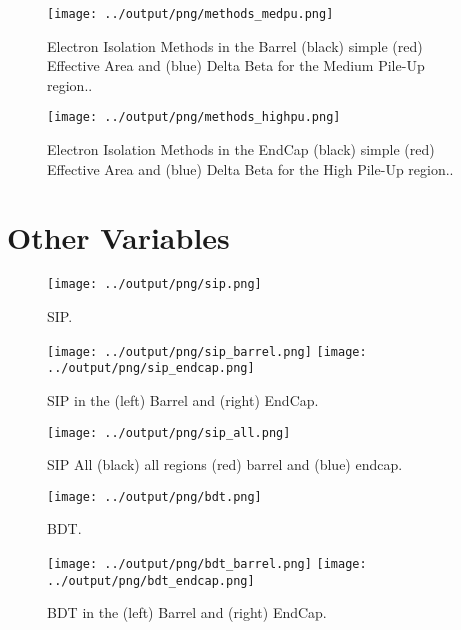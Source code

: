 \documentclass[11pt]{book}
\begin{document}
\begin{figure}[ht]
\centering
\texttt{[image: ../output/png/methods\_medpu.png]}
\caption{Electron Isolation Methods in the Barrel (black) simple (red) Effective Area and (blue) Delta Beta for the Medium Pile-Up region..}
\label{fig:methods_medpu}
\end{figure}

\begin{figure}[ht]
\centering
\texttt{[image: ../output/png/methods\_highpu.png]}
\caption{Electron Isolation Methods in the EndCap (black) simple (red) Effective Area and (blue) Delta Beta for the High Pile-Up region..}
\label{fig:methods_highpu}
\end{figure}
\clearpage


\section{Other Variables}

\begin{figure}[ht]
\centering
\texttt{[image: ../output/png/sip.png]}
\caption{SIP.}
\label{fig:sip}
\end{figure}
\clearpage

\begin{figure}[ht]
\centering
\texttt{[image: ../output/png/sip\_barrel.png]}
\texttt{[image: ../output/png/sip\_endcap.png]}
\caption{SIP in the (left) Barrel and (right) EndCap.}
\label{fig:sip_regions}
\end{figure}

\begin{figure}[htb]
\centering
\texttt{[image: ../output/png/sip\_all.png]}
\caption{SIP All (black) all regions (red) barrel and (blue) endcap.}
\label{fig:sip_all}
\end{figure}

\begin{figure}[htb]
\centering
\texttt{[image: ../output/png/bdt.png]}
\caption{BDT.}
\label{fig:bdt}
\end{figure}
\clearpage

\begin{figure}[htb]
\centering
\texttt{[image: ../output/png/bdt\_barrel.png]}
\texttt{[image: ../output/png/bdt\_endcap.png]}
\caption{BDT in the (left) Barrel and (right) EndCap.}
\label{fig:bdt_regions}
\end{figure}
\end{document}
